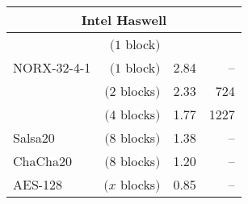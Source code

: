 \begin{columns}[t]
\begin{column}{0.55\linewidth}
\begin{table}
\begin{tabular}{l r | c | r }
    \hline
    \hline
    \multicolumn{4}{c}{{\bf Intel Haswell}}\\
    \hline
    \cDrk{\bf \Gimli}		&$(1$ block$)$  & \haswellcycles & \haswellrom\\
    \hline
    NORX-32-4-1 						&$(1$ block$)$	& 2.84 & -- \\
    \hline
    \cDrk{\bf \Gimli} 		&$(2$ blocks$)$	& 2.33 & 724 \\
    \hline
    \cDrk{\bf \Gimli} 		&$(4$ blocks$)$	& 1.77 & 1227 \\
    \hline
    Salsa20 							&$(8$ blocks$)$	& 1.38 & --  \\
    \hline
    ChaCha20 							&$(8$ blocks$)$	& 1.20 & --  \\
    \hline
    AES-128 							&$(x$ blocks$)$ & 0.85 & -- \\
    \hline
\end{tabular}
\end{table}
\end{column}
\end{columns}
